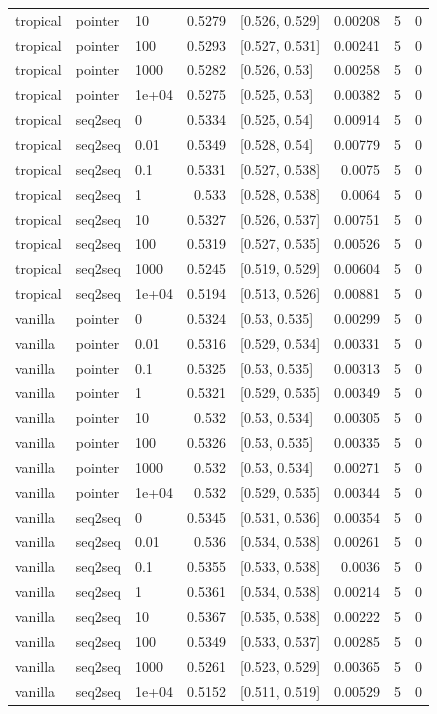 \documentclass[10pt]{article}
\begin{document}
{\begin{longtable}{lllrlrrr}
tropical & pointer & 10 & 0.5279 & [0.526, 0.529] & 0.00208 & 5 & 0\\
tropical & pointer & 100 & 0.5293 & [0.527, 0.531] & 0.00241 & 5 & 0\\
tropical & pointer & 1000 & 0.5282 & [0.526, 0.53] & 0.00258 & 5 & 0\\
tropical & pointer & 1e+04 & 0.5275 & [0.525, 0.53] & 0.00382 & 5 & 0\\
tropical & seq2seq & 0 & 0.5334 & [0.525, 0.54] & 0.00914 & 5 & 0\\
tropical & seq2seq & 0.01 & 0.5349 & [0.528, 0.54] & 0.00779 & 5 & 0\\
tropical & seq2seq & 0.1 & 0.5331 & [0.527, 0.538] & 0.0075 & 5 & 0\\
tropical & seq2seq & 1 & 0.533 & [0.528, 0.538] & 0.0064 & 5 & 0\\
tropical & seq2seq & 10 & 0.5327 & [0.526, 0.537] & 0.00751 & 5 & 0\\
tropical & seq2seq & 100 & 0.5319 & [0.527, 0.535] & 0.00526 & 5 & 0\\
tropical & seq2seq & 1000 & 0.5245 & [0.519, 0.529] & 0.00604 & 5 & 0\\
tropical & seq2seq & 1e+04 & 0.5194 & [0.513, 0.526] & 0.00881 & 5 & 0\\
vanilla & pointer & 0 & 0.5324 & [0.53, 0.535] & 0.00299 & 5 & 0\\
vanilla & pointer & 0.01 & 0.5316 & [0.529, 0.534] & 0.00331 & 5 & 0\\
vanilla & pointer & 0.1 & 0.5325 & [0.53, 0.535] & 0.00313 & 5 & 0\\
vanilla & pointer & 1 & 0.5321 & [0.529, 0.535] & 0.00349 & 5 & 0\\
vanilla & pointer & 10 & 0.532 & [0.53, 0.534] & 0.00305 & 5 & 0\\
vanilla & pointer & 100 & 0.5326 & [0.53, 0.535] & 0.00335 & 5 & 0\\
vanilla & pointer & 1000 & 0.532 & [0.53, 0.534] & 0.00271 & 5 & 0\\
vanilla & pointer & 1e+04 & 0.532 & [0.529, 0.535] & 0.00344 & 5 & 0\\
vanilla & seq2seq & 0 & 0.5345 & [0.531, 0.536] & 0.00354 & 5 & 0\\
vanilla & seq2seq & 0.01 & 0.536 & [0.534, 0.538] & 0.00261 & 5 & 0\\
vanilla & seq2seq & 0.1 & 0.5355 & [0.533, 0.538] & 0.0036 & 5 & 0\\
vanilla & seq2seq & 1 & 0.5361 & [0.534, 0.538] & 0.00214 & 5 & 0\\
vanilla & seq2seq & 10 & 0.5367 & [0.535, 0.538] & 0.00222 & 5 & 0\\
vanilla & seq2seq & 100 & 0.5349 & [0.533, 0.537] & 0.00285 & 5 & 0\\
vanilla & seq2seq & 1000 & 0.5261 & [0.523, 0.529] & 0.00365 & 5 & 0\\
vanilla & seq2seq & 1e+04 & 0.5152 & [0.511, 0.519] & 0.00529 & 5 & 0\\
\bottomrule
\end{longtable}
}
\end{document}
